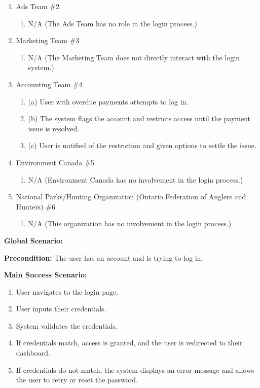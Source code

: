 \documentclass[]{article}
\begin{document}
\begin{enumerate}[{\bf BE1.}]
\begin{enumerate}[{\bf VP1.}]
    \item Ads Team \#2 \\
    \begin{enumerate}
        \item N/A (The Ads Team has no role in the login process.)
    \end{enumerate}

    \item Marketing Team \#3 \\
    \begin{enumerate}
        \item N/A (The Marketing Team does not directly interact with the login system.)
    \end{enumerate}

    \item Accounting Team \#4 \\
    \begin{enumerate}
        \item (a) User with overdue payments attempts to log in.
        \item (b) The system flags the account and restricts access until the payment issue is resolved.
        \item (c) User is notified of the restriction and given options to settle the issue.
    \end{enumerate}

    \item Environment Canada \#5 \\
    \begin{enumerate}
        \item N/A (Environment Canada has no involvement in the login process.)
    \end{enumerate}

    \item National Parks/Hunting Organization (Ontario Federation of Anglers and Hunters) \#6 \\
    \begin{enumerate}
        \item N/A (This organization has no involvement in the login process.)
    \end{enumerate}
\end{enumerate}

\textbf{Global Scenario:}

\textbf{Precondition:} The user has an account and is trying to log in.

\textbf{Main Success Scenario:}
\begin{enumerate}
    \item User navigates to the login page.
    \item User inputs their credentials.
    \item System validates the credentials.
    \item If credentials match, access is granted, and the user is redirected to their dashboard.
    \item If credentials do not match, the system displays an error message and allows the user to retry or reset the password.
\end{enumerate}


\end{enumerate}
\end{document}
